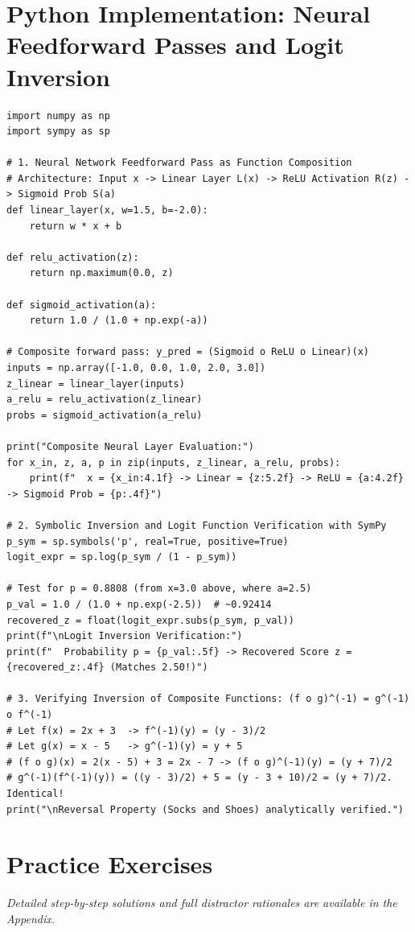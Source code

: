 \section{Python Implementation: Neural Feedforward Passes and Logit Inversion}

\begin{lstlisting}[caption={Function Compositions, Sigmoid, and Logit Inversion in Python}]
import numpy as np
import sympy as sp

# 1. Neural Network Feedforward Pass as Function Composition
# Architecture: Input x -> Linear Layer L(x) -> ReLU Activation R(z) -> Sigmoid Prob S(a)
def linear_layer(x, w=1.5, b=-2.0):
    return w * x + b

def relu_activation(z):
    return np.maximum(0.0, z)

def sigmoid_activation(a):
    return 1.0 / (1.0 + np.exp(-a))

# Composite forward pass: y_pred = (Sigmoid o ReLU o Linear)(x)
inputs = np.array([-1.0, 0.0, 1.0, 2.0, 3.0])
z_linear = linear_layer(inputs)
a_relu = relu_activation(z_linear)
probs = sigmoid_activation(a_relu)

print("Composite Neural Layer Evaluation:")
for x_in, z, a, p in zip(inputs, z_linear, a_relu, probs):
    print(f"  x = {x_in:4.1f} -> Linear = {z:5.2f} -> ReLU = {a:4.2f} -> Sigmoid Prob = {p:.4f}")

# 2. Symbolic Inversion and Logit Function Verification with SymPy
p_sym = sp.symbols('p', real=True, positive=True)
logit_expr = sp.log(p_sym / (1 - p_sym))

# Test for p = 0.8808 (from x=3.0 above, where a=2.5)
p_val = 1.0 / (1.0 + np.exp(-2.5))  # ~0.92414
recovered_z = float(logit_expr.subs(p_sym, p_val))
print(f"\nLogit Inversion Verification:")
print(f"  Probability p = {p_val:.5f} -> Recovered Score z = {recovered_z:.4f} (Matches 2.50!)")

# 3. Verifying Inversion of Composite Functions: (f o g)^(-1) = g^(-1) o f^(-1)
# Let f(x) = 2x + 3  -> f^(-1)(y) = (y - 3)/2
# Let g(x) = x - 5   -> g^(-1)(y) = y + 5
# (f o g)(x) = 2(x - 5) + 3 = 2x - 7 -> (f o g)^(-1)(y) = (y + 7)/2
# g^(-1)(f^(-1)(y)) = ((y - 3)/2) + 5 = (y - 3 + 10)/2 = (y + 7)/2. Identical!
print("\nReversal Property (Socks and Shoes) analytically verified.")
\end{lstlisting}

\newpage
\section{Practice Exercises}
\textit{Detailed step-by-step solutions and full distractor rationales are available in the Appendix.}


